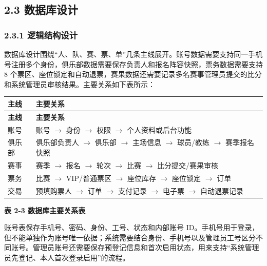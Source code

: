 \documentclass[UTF8,zihao=-4,a4paper]{ctexart}
\newcommand{\tablecaptionline}[1]{\vspace{-1.6em}\begin{center}\small\bfseries #1\end{center}\vspace{0.2em}}
\begin{document}
\subsection*{2.3 数据库设计}
{}

\subsubsection*{2.3.1 逻辑结构设计}
{}

数据库设计围绕“人、队、赛、票、单”几条主线展开。账号数据需要支持同一手机号注册多个身份，俱乐部数据需要保存负责人和报名阵容快照，票务数据需要支持 8 个票区、座位锁定和自动退票，赛果数据还需要记录多名赛事管理员提交的比分和系统管理员审核结果。主要关系如下表所示：


\begin{center}
\small
\begin{longtable}{>{\raggedright\arraybackslash}p{} >{\raggedright\arraybackslash}p{}}
\toprule
\rowcolor{tablehead}
\textbf{主线} & \textbf{主要关系} \\
\midrule
\endfirsthead
\toprule
\rowcolor{tablehead}
\textbf{主线} & \textbf{主要关系} \\
\midrule
\endhead
账号 & 账号 $\rightarrow$ 身份 $\rightarrow$ 权限 $\rightarrow$ 个人资料或后台功能 \\
\midrule
俱乐部 & 俱乐部负责人 $\rightarrow$ 俱乐部 $\rightarrow$ 主场信息 $\rightarrow$ 球员/教练 $\rightarrow$ 赛季报名快照 \\
\midrule
赛事 & 赛季 $\rightarrow$ 报名 $\rightarrow$ 轮次 $\rightarrow$ 比赛 $\rightarrow$ 比分提交/赛果审核 \\
\midrule
票务 & 比赛 $\rightarrow$ VIP/普通票区 $\rightarrow$ 座位库存 $\rightarrow$ 座位锁定 $\rightarrow$ 订单 \\
\midrule
交易 & 预填购票人 $\rightarrow$ 订单 $\rightarrow$ 支付记录 $\rightarrow$ 电子票 $\rightarrow$ 自动退票记录 \\
\midrule
\bottomrule
\end{longtable}
\end{center}

\tablecaptionline{表 2-3 数据库主要关系表}

账号表保存手机号、密码、身份、工号、状态和内部账号 ID。手机号用于登录，但不能单独作为账号唯一依据；系统需要结合身份、手机号以及管理员工号区分不同账号。管理员账号还需要保存预登记信息和首次启用状态，用来支持“系统管理员先登记、本人首次登录启用”的流程。
\end{document}
